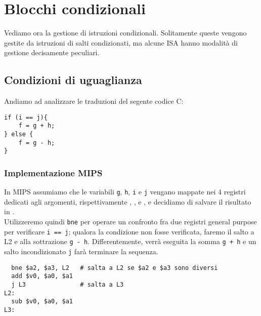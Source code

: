 \documentclass[class=book, crop=false, oneside]{standalone}
\begin{document}
\section{Blocchi condizionali}
Vediamo ora la gestione di istruzioni condizionali. Solitamente queste vengono gestite da istruzioni di salti condizionati, ma alcune ISA hanno modalità di gestione decisamente peculiari.
\subsection*{Condizioni di uguaglianza}
Andiamo ad analizzare le traduzioni del segente codice C:
\begin{verbatim}
if (i == j){
	f = g + h;
} else {
	f = g - h;
}
\end{verbatim}
\subsubsection{Implementazione MIPS}
In MIPS assumiamo che le variabili \texttt{g}, \texttt{h}, \texttt{i} e \texttt{j} vengano mappate nei 4 registri dedicati agli argomenti, rispettivamente , ,  e , e decidiamo di salvare il risultato in .\\
Utilizzeremo quindi \texttt{bne} per operare un confronto fra due registri general purpose per verificare \texttt{i == j}; qualora la condizione non fosse verificata, faremo il salto a L2 e alla sottrazione \texttt{g - h}. Differentemente, verrà eseguita la somma \texttt{g + h} e un salto incondizionato \texttt{j} farà terminare la sequenza.
\begin{verbatim}
  bne $a2, $a3, L2   # salta a L2 se $a2 e $a3 sono diversi
  add $v0, $a0, $a1
  j L3               # salta a L3
L2:
  sub $v0, $a0, $a1
L3:
\end{verbatim}
\end{document}
